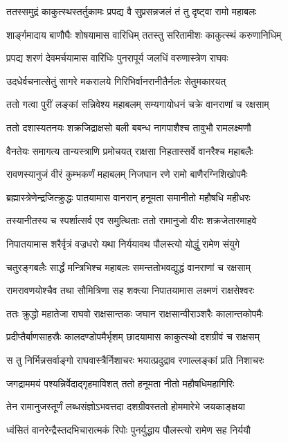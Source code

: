 \twolineshloka
{ततस्समुद्रं काकुत्स्थस्तर्तुकामः प्रपद्य वै}
{सुप्रसन्नजलं तं तु दृष्ट्वा रामो महाबलः}%

\twolineshloka
{शार्ङ्गमादाय बाणौघैः शोषयामास वारिधिम्}
{ततस्तु सरितामीशः काकुत्स्थं करुणानिधिम्}%

\twolineshloka
{प्रपद्य शरणं देवमर्चयामास वारिधिः}
{पुनरापूर्य जलधिं वरुणास्त्रेण राघवः}%

\twolineshloka
{उदधेर्वचनात्सेतुं सागरे मकरालये}
{गिरिभिर्वानरानीतैर्नलः सेतुमकारयत्}%

\twolineshloka
{ततो गत्वा पुरीं लङ्कां सन्निवेश्य महाबलम्}
{सम्यगायोधनं चक्रे वानराणां च रक्षसाम्}%

\twolineshloka
{ततो दशास्यतनयः शक्रजिद्राक्षसो बली}
{बबन्ध नागपाशैश्च तावुभौ रामलक्ष्मणौ}%

\twolineshloka
{वैनतेयः समागत्य तान्यस्त्राणि प्रमोचयत्}
{राक्षसा निहतास्सर्वे वानरैश्च महाबलैः}%

\twolineshloka
{रावणस्यानुजं वीरं कुम्भकर्णं महाबलम्}
{निजघान रणे रामो बाणैरग्निशिखोपमैः}%

\twolineshloka
{ब्रह्मास्त्रेणेन्द्रजित्क्रुद्धः पातयामास वानरान्}
{हनूमता समानीतो महौषधि महीधरः}%

\twolineshloka
{तस्यानीतस्य च स्पर्शात्सर्व एव समुत्थिताः}
{ततो रामानुजो वीरः शक्रजेतारमाहवे}%

\twolineshloka
{निपातयामास शरैर्वृत्रं वज्रधरो यथा}
{निर्ययावथ पौलस्त्यो योद्धुं रामेण संयुगे}%

\twolineshloka
{चतुरङ्गबलैः सार्द्धं मन्त्रिभिश्च महाबलः}
{समन्ततोभवद्युद्धं वानराणां च रक्षसाम्}%

\twolineshloka
{रामरावणयोश्चैव तथा सौमित्रिणा सह}
{शक्त्या निपातयामास लक्ष्मणं राक्षसेश्वरः}%

\twolineshloka
{ततः क्रुद्धो महातेजा राघवो राक्षसान्तकः}
{जघान राक्षसान्वीराञ्शरैः कालान्तकोपमैः}%

\twolineshloka
{प्रदीप्तैर्बाणसाहस्रैः कालदण्डोपमैर्भृशम्}
{छादयामास काकुत्स्थो दशग्रीवं च राक्षसम्}%

\twolineshloka
{स तु निर्भिन्नसर्वाङ्गो राघवास्त्रैर्निशाचरः}
{भयात्प्रदुद्राव रणाल्लङ्कां प्रति निशाचरः}%

\twolineshloka
{जगद्राममयं पश्यन्निर्वेदाद्गृहमाविशत्}
{ततो हनूमता नीतो महौषधिमहागिरिः}%

\twolineshloka
{तेन रामानुजस्तूर्णं लब्धसंज्ञोऽभवत्तदा}
{दशग्रीवस्ततो होममारेभे जयकाङ्क्षया}%

\twolineshloka
{ध्वंसितं वानरेन्द्रैस्तदभिचारात्मकं रिपोः}
{पुनर्युद्धाय पौलस्त्यो रामेण सह निर्ययौ}%

